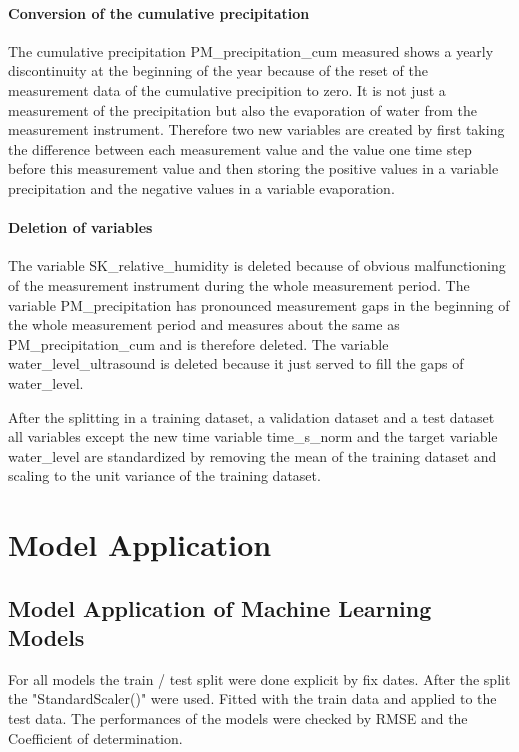 \documentclass[a4paper,12pt]{article}
\begin{document}
\paragraph{Conversion of the cumulative precipitation}
The cumulative precipitation PM\_precipitation\_cum measured shows a yearly discontinuity at the beginning of the year because of the reset of the measurement data of the cumulative precipition to zero. It is not just a measurement of the precipitation but also the evaporation of water from the measurement instrument. Therefore two new variables are created by first taking the difference between each measurement value and the value one time step before this measurement value and then storing the positive values in a variable precipitation and the negative values in a variable evaporation.

\paragraph{Deletion of variables}
The variable SK\_relative\_humidity is deleted because of obvious malfunctioning of the measurement instrument during the whole measurement period. The variable PM\_precipitation has pronounced measurement gaps in the beginning of the whole measurement period and measures about the same as PM\_precipitation\_cum and is therefore deleted. The variable water\_level\_ultrasound is deleted because it just served to fill the gaps of water\_level.

After the splitting in a training dataset, a validation dataset and a test dataset all variables except the new time variable time\_s\_norm and the target variable water\_level are standardized by removing the mean of the training dataset and scaling to the unit variance of the training dataset.

\newpage
\section{Model Application}

\subsection{Model Application of Machine Learning Models}

For all models the train / test split were done explicit by fix dates.
After the split the "StandardScaler()" were used. Fitted with the train data and applied to the test data.
The performances of the models were checked by RMSE and the Coefficient of determination.
\end{document}

